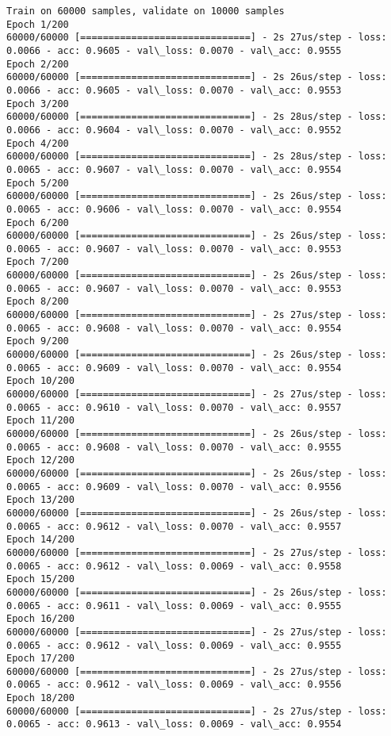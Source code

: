 \documentclass[11pt]{article}
\begin{document}
    \begin{Verbatim}[commandchars=\\\{\}]
Train on 60000 samples, validate on 10000 samples
Epoch 1/200
60000/60000 [==============================] - 2s 27us/step - loss: 0.0066 - acc: 0.9605 - val\_loss: 0.0070 - val\_acc: 0.9555
Epoch 2/200
60000/60000 [==============================] - 2s 26us/step - loss: 0.0066 - acc: 0.9605 - val\_loss: 0.0070 - val\_acc: 0.9553
Epoch 3/200
60000/60000 [==============================] - 2s 28us/step - loss: 0.0066 - acc: 0.9604 - val\_loss: 0.0070 - val\_acc: 0.9552
Epoch 4/200
60000/60000 [==============================] - 2s 28us/step - loss: 0.0065 - acc: 0.9607 - val\_loss: 0.0070 - val\_acc: 0.9554
Epoch 5/200
60000/60000 [==============================] - 2s 26us/step - loss: 0.0065 - acc: 0.9606 - val\_loss: 0.0070 - val\_acc: 0.9554
Epoch 6/200
60000/60000 [==============================] - 2s 26us/step - loss: 0.0065 - acc: 0.9607 - val\_loss: 0.0070 - val\_acc: 0.9553
Epoch 7/200
60000/60000 [==============================] - 2s 26us/step - loss: 0.0065 - acc: 0.9607 - val\_loss: 0.0070 - val\_acc: 0.9553
Epoch 8/200
60000/60000 [==============================] - 2s 27us/step - loss: 0.0065 - acc: 0.9608 - val\_loss: 0.0070 - val\_acc: 0.9554
Epoch 9/200
60000/60000 [==============================] - 2s 26us/step - loss: 0.0065 - acc: 0.9609 - val\_loss: 0.0070 - val\_acc: 0.9554
Epoch 10/200
60000/60000 [==============================] - 2s 27us/step - loss: 0.0065 - acc: 0.9610 - val\_loss: 0.0070 - val\_acc: 0.9557
Epoch 11/200
60000/60000 [==============================] - 2s 26us/step - loss: 0.0065 - acc: 0.9608 - val\_loss: 0.0070 - val\_acc: 0.9555
Epoch 12/200
60000/60000 [==============================] - 2s 26us/step - loss: 0.0065 - acc: 0.9609 - val\_loss: 0.0070 - val\_acc: 0.9556
Epoch 13/200
60000/60000 [==============================] - 2s 26us/step - loss: 0.0065 - acc: 0.9612 - val\_loss: 0.0070 - val\_acc: 0.9557
Epoch 14/200
60000/60000 [==============================] - 2s 27us/step - loss: 0.0065 - acc: 0.9612 - val\_loss: 0.0069 - val\_acc: 0.9558
Epoch 15/200
60000/60000 [==============================] - 2s 26us/step - loss: 0.0065 - acc: 0.9611 - val\_loss: 0.0069 - val\_acc: 0.9555
Epoch 16/200
60000/60000 [==============================] - 2s 27us/step - loss: 0.0065 - acc: 0.9612 - val\_loss: 0.0069 - val\_acc: 0.9555
Epoch 17/200
60000/60000 [==============================] - 2s 27us/step - loss: 0.0065 - acc: 0.9612 - val\_loss: 0.0069 - val\_acc: 0.9556
Epoch 18/200
60000/60000 [==============================] - 2s 27us/step - loss: 0.0065 - acc: 0.9613 - val\_loss: 0.0069 - val\_acc: 0.9554

\end{Verbatim}
\end{document}
